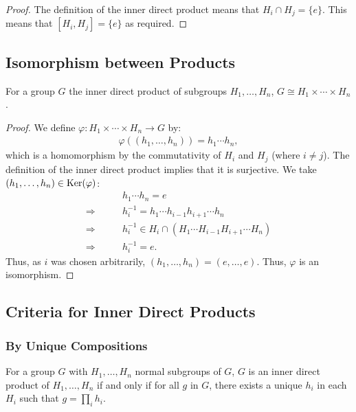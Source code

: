 \begin{proof}
    The definition of the inner direct product means that
    $H_i \cap H_j = \{e\}$. This means that $[H_i, H_j] = \{e\}$
    as required.
\end{proof}

\subsection{Isomorphism between Products}

For a group $G$ the inner direct product of subgroups $H_1, \ldots, H_n$,
$G \cong H_1 \times \cdots \times H_n$.

\begin{proof}
    We define $\varphi : H_1 \times \cdots \times H_n \to G$ by: \begin{align*}
        \varphi((h_1, \ldots, h_n)) = h_1 \cdots h_n,
    \end{align*} which is a homomorphism by the commutativity of
    $H_i$ and $H_j$ (where $i \neq j$). The definition of the
    inner direct product implies that it is surjective. We
    take $(h_1, \ldots, h_n) \in \operatorname{Ker}(\varphi)$: \begin{align*}
        &h_1 \cdots h_n = e \\
        \Longrightarrow \qquad& h_i^{-1} = h_1 \cdots h_{i - 1}h_{i + 1} \cdots h_n \\
        \Longrightarrow \qquad& h_i^{-1} \in H_i \cap (H_1 \cdots H_{i - 1} H_{i + 1} \cdots H_n) \\
        \Longrightarrow \qquad& h_i^{-1} = e.
    \end{align*} Thus, as $i$ was chosen arbitrarily, $(h_1, \ldots, h_n) = (e, \ldots, e)$.
    Thus, $\varphi$ is an isomorphism.
\end{proof}

\subsection{Criteria for Inner Direct Products}

\subsubsection{By Unique Compositions}

For a group $G$ with $H_1, \ldots, H_n$ normal subgroups of $G$,
$G$ is an inner direct product of $H_1, \ldots, H_n$ if and
only if for all $g$ in $G$, there exists a unique $h_i$ in each 
$H_i$ such that $g = \prod_ih_i$.

